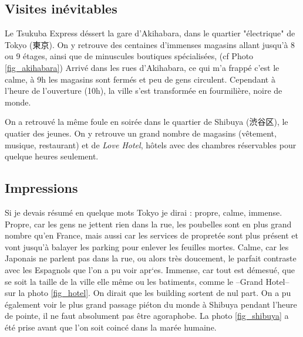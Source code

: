 \documentclass[journal]{RapportFR}
\begin{document}
\begin{CJK*}{UTF8}{min}
\subsection{Visites in\'evitables}

Le Tsukuba Express d\'essert la gare d'Akihabara, dans le quartier "\'electrique" de Tokyo (東京). On y retrouve des centaines d'immenses magasins allant jusqu'\`a 8 ou 9 \'etages, ainsi que de minuscules boutiques sp\'ecialis\'ees, (cf Photo \ref{fig_akihabara})
Arriv\'e dans les rues d'Akihabara, ce qui m'a frapp\'e c'est le calme, \`a 9h les magasins sont ferm\'es et peu de gens circulent. Cependant \`a l'heure de l'ouverture (10h), la ville s'est transform\'ee en fourmili\`ere, noire de monde.

On a retrouv\'e la m\^eme foule en soir\'ee dans le quartier de Shibuya (渋谷区), le quatier des jeunes. On y retrouve un grand nombre de magasins (v\^etement, musique, restaurant) et de \textit{Love Hotel}, h\^otels avec des chambres r\'eservables pour quelque heures seulement.


\subsection{Impressions}



Si je devais r\'esum\'e en quelque mots Tokyo je dirai : propre, calme, immense.
Propre, car les gens ne jettent rien dans la rue, les poubelles sont en plus grand nombre qu'en France, mais aussi car les services de propret\'ee sont plus pr\'esent et vont jusqu'\`a balayer les parking pour enlever les feuilles mortes.
Calme, car les Japonais ne parlent pas dans la rue, ou alors tr\`es doucement, le parfait contraste avec les Espagnols que l'on a pu voir apr`es.
Immense, car tout est d\'emesu\'e, que se soit la taille de la ville elle m\^eme ou les batiments, comme le --Grand Hotel-- sur la photo \ref{fig_hotel}. On dirait que les building sortent de nul part. On a pu \'egalement voir le plus grand passage pi\'eton du monde \`a Shibuya pendant l'heure de pointe, il ne faut absolument pas \^etre agoraphobe. La photo \ref{fig_shibuya} a \'et\'e prise avant que l'on soit coinc\'e dans la mar\'ee humaine.


\end{CJK*}
\end{document}
